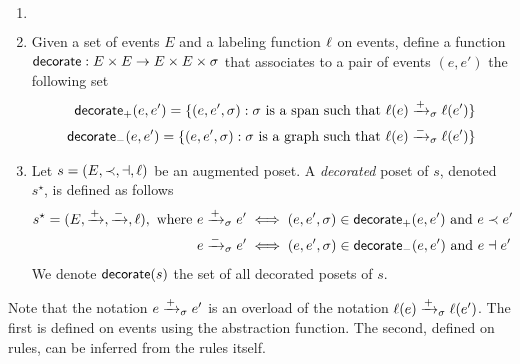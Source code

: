 \begin{definition}
  \label{def:decorate_poset}
  \begin{enumerate}
  \item[] $~$
  \item Given a set of events $E$ and a labeling function $\ell$ on events, define a function $\mathsf{decorate}:E\times E \to E\times E\times \sigma$ that associates to a pair of events $(e,e')$ the following set
    \begin{align*}
      \mathsf{decorate}_{+}(e,e') = \{(e,e',\sigma) : \sigma\text{ is a span such that }\ell(e)\mathrel{\xrightarrow{+}}_{\sigma} \ell(e')\}\\
       \mathsf{decorate}_{-}(e,e') = \{(e,e',\sigma) : \sigma\text{ is a graph such that }\ell(e)\mathrel{\xrightarrow{-}}_{\sigma} \ell(e')\}
    \end{align*}

  \item Let $s = (E,\prec,\dashv,\ell)$ be an augmented poset. A \emph{decorated} poset of $s$, denoted $s^{\star}$, is defined as follows
    \begin{align*}
      s^{\star} = (E,\mathrel{\xrightarrow{+}},\mathrel{\xrightarrow{-}},\ell), \text{ where }
      &e\mathrel{\xrightarrow{+}}_{\sigma} e' \iff (e,e',{\sigma})\in\mathsf{decorate}_+(e,e')\text{ and }e\prec e'\\
      &e\mathrel{\xrightarrow{-}}_{\sigma} e' \iff (e,e',{\sigma})\in\mathsf{decorate}_-(e,e')\text{ and }e\dashv e'\\
    \end{align*}
    We denote $\mathsf{decorate}(s)$ the set of all decorated posets of $s$.
  \end{enumerate}
\end{definition}

Note that the notation $e\mathrel{\xrightarrow{+}}_{\sigma} e'$ is an overload of the notation $\ell(e)\mathrel{\xrightarrow{+}}_{\sigma} \ell(e')$. The first is defined on events using the abstraction function. The second, defined on rules, can be inferred from the rules itself.

